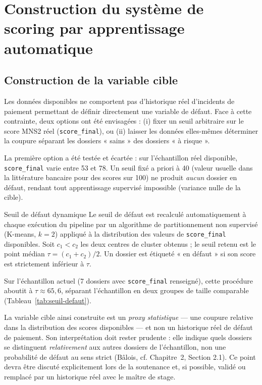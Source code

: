 \chapter{Construction du système de scoring par apprentissage automatique}

\section{Construction de la variable cible}

Les données disponibles ne comportent pas d'historique réel d'incidents de paiement permettant
de définir directement une variable de défaut. Face à cette contrainte, deux options ont été
envisagées : (i) fixer un seuil arbitraire sur le score MNS2 réel (\texttt{score\_final}), ou
(ii) laisser les données elles-mêmes déterminer la coupure séparant les dossiers « sains » des
dossiers « à risque ».

La première option a été testée et écartée : sur l'échantillon réel disponible,
\texttt{score\_final} varie entre 53 et 78. Un seuil fixé a priori à 40 (valeur usuelle dans la
littérature bancaire pour des scores sur 100) ne produit \emph{aucun} dossier en défaut, rendant
tout apprentissage supervisé impossible (variance nulle de la cible).

\begin{definition}{Seuil de défaut dynamique}
Le seuil de défaut est recalculé automatiquement à chaque exécution du pipeline par un
algorithme de partitionnement non supervisé (K-means, $k=2$) appliqué à la distribution des
valeurs de \texttt{score\_final} disponibles. Soit $c_1 < c_2$ les deux centres de cluster
obtenus ; le seuil retenu est le point médian $\tau = (c_1 + c_2)/2$. Un dossier est étiqueté
« en défaut » si son score est strictement inférieur à $\tau$.
\end{definition}

Sur l'échantillon actuel (7 dossiers avec \texttt{score\_final} renseigné), cette procédure
aboutit à $\tau \approx 65{,}6$, séparant l'échantillon en deux groupes de taille comparable
(Tableau~\ref{tab:seuil-defaut}).

\begin{limite}
La variable cible ainsi construite est un \emph{proxy statistique} — une coupure relative dans
la distribution des scores disponibles — et non un historique réel de défaut de paiement. Son
interprétation doit rester prudente : elle indique quels dossiers se distinguent
\emph{relativement} aux autres dossiers de l'échantillon, non une probabilité de défaut au sens
strict (Bâlois, cf. Chapitre~2, Section 2.1). Ce point devra être discuté explicitement lors de
la soutenance et, si possible, validé ou remplacé par un historique réel avec le maître de stage.
\end{limite}

